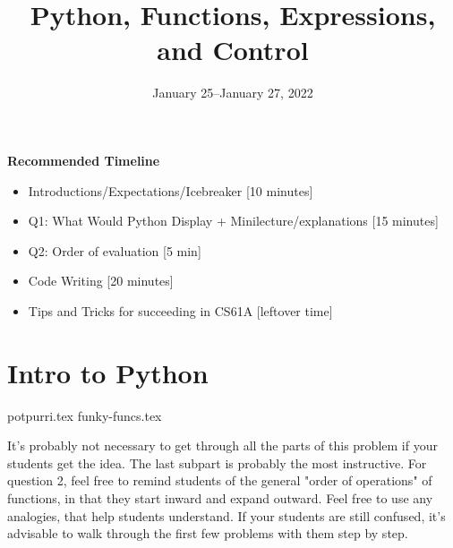 \documentclass{exam}
\title{Python, Functions, Expressions, and Control}
\date{January 25--January 27, 2022}
\begin{document}
\maketitle
\begin{meta}
\textbf{Recommended Timeline}
\begin{itemize}
  \item Introductions/Expectations/Icebreaker [10 minutes]
  \item Q1: What Would Python Display + Minilecture/explanations [15 minutes]
  \item Q2: Order of evaluation [5 min]
  \item Code Writing [20 minutes]
  \item Tips and Tricks for succeeding in CS61A [leftover time]
\end{itemize}
\end{meta}


\section{Intro to Python}
\begin{questions}
{potpurri.tex}
{funky-funcs.tex}
\begin{questionmeta}
  It's probably not necessary to get through all the parts of this problem if your students get the idea. The last subpart is probably the most instructive. 
  For question 2, feel free to remind students of the general "order of operations" of functions, in that they start inward and expand outward. Feel free to use any analogies, that help students understand.
  If your students are still confused, it's advisable to walk through the first few problems with them step by step.
\end{questionmeta}
\end{questions}
\end{document}
